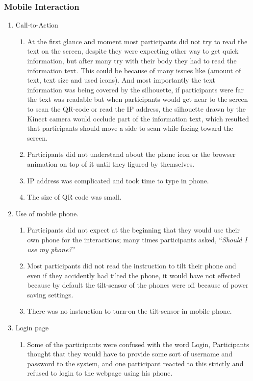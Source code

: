 \subsubsection{Mobile Interaction}
\begin{enumerate}
\item	Call-to-Action
\begin{enumerate}
\item	At the first glance and moment most participants did not try to read the text on the screen, despite they were expecting other way to get quick information, but after many try with their body they had to read the information text. This could be because of many issues like (amount of text, text size and used icons). And most importantly the text information was being covered by the silhouette, if participants were far the text was readable but when participants would get near to the screen to scan the QR-code or read the IP address, the silhouette drawn by the Kinect camera would occlude part of the information text, which resulted that participants should move a side to scan while facing toward the screen.
\item	Participants did not understand about the phone icon or the browser animation on top of it until they figured by themselves.
\item	IP address was complicated and took time to type in phone.
\item	The size of QR code was small.
\end{enumerate}

\item	Use of mobile phone.
\begin{enumerate}
\item	Participants did not expect at the beginning that they would use their own phone for the interactions; many times participants asked, ``\emph{Should I use my phone?}'' 
\item	Most participants did not read the instruction to tilt their phone and even if they accidently had tilted the phone, it would have not effected because by default the tilt-sensor of the phones were off because of power saving settings. 
\item	There was no instruction to turn-on the tilt-sensor in mobile phone.
\end{enumerate}

\item	Login page
\begin{enumerate}
\item	Some of the participants were confused with the word Login, Participants thought that they would have to provide some sort of username and password to the system, and one participant reacted to this strictly and refused to login to the webpage using his phone.
\end{enumerate}


\end{enumerate}
